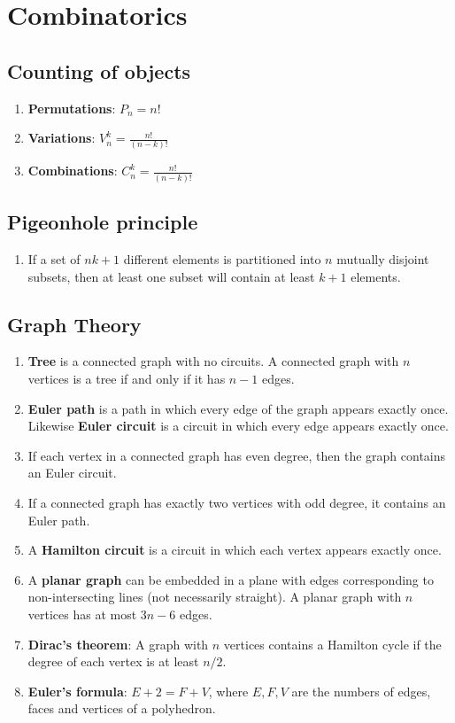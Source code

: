 \documentclass{article}
\begin{document}
\section{Combinatorics}
  \subsection{Counting of objects}
    \begin{enumerate}
      \item \textbf{Permutations}: $P_n=n!$
      \item \textbf{Variations}: $V^k_n=\frac{n!}{(n-k)!}$
      \item \textbf{Combinations}: $C^k_n=\frac{n!}{(n-k)!}$
    \end{enumerate}
  \subsection{Pigeonhole principle}
    \begin{enumerate}
      \item If a set of $nk + 1$ different elements is partitioned into $n$ mutually disjoint subsets, then at least one subset will contain at least $k + 1$ elements.
    \end{enumerate}
  \subsection{Graph Theory}
    \begin{enumerate}
      \item \textbf{Tree} is a connected graph with no circuits. A connected graph with $n$ vertices is a tree if and only if it has $n-1$ edges.
      \item \textbf{Euler path} is a path in which every edge of the graph appears exactly once. Likewise \textbf{Euler circuit} is a circuit in which every edge appears exactly once.
      \item If each vertex in a connected graph has even degree, then the graph contains an Euler circuit.
      \item If a connected graph has exactly two vertices with odd degree, it contains an Euler path.
      \item A \textbf{Hamilton circuit} is a circuit in which each vertex appears exactly once.
      \item
      A \textbf{planar graph} can be embedded in a plane with edges corresponding to non-intersecting lines (not necessarily straight). A planar graph with $n$ vertices has at most $3n-6$ edges.
      \item \textbf{Dirac's theorem}: A graph with $n$ vertices contains a Hamilton cycle if the degree of each vertex is at least $n/2$.
      \item \textbf{Euler's formula}: $E+2=F+V$, where $E,F,V$ are the numbers of edges, faces and vertices of a polyhedron.

  \end{enumerate}
\end{document}
